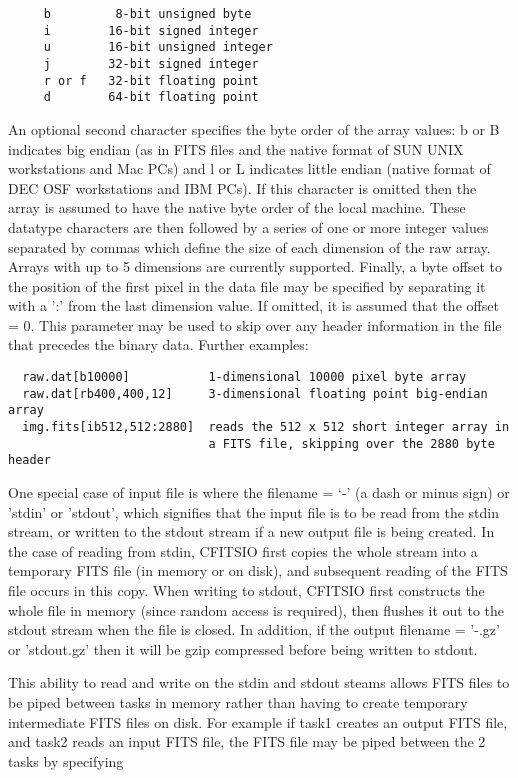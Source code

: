 \documentclass[11pt]{book}
\begin{document}
\begin{verbatim}
     b         8-bit unsigned byte
     i        16-bit signed integer
     u        16-bit unsigned integer
     j        32-bit signed integer
     r or f   32-bit floating point
     d        64-bit floating point
\end{verbatim}
An optional second character specifies the byte order of the array
values: b or B indicates big endian (as in FITS files and the native
format of SUN UNIX workstations and Mac PCs) and l or L indicates
little endian (native format of DEC OSF workstations and IBM PCs).  If
this character is omitted then the array is assumed to have the native
byte order of the local machine.  These datatype characters are then
followed by a series of one or more integer values separated by commas
which define the size of each dimension of the raw array.  Arrays with
up to 5 dimensions are currently supported.  Finally, a byte offset to
the position of the first pixel in the data file may be specified by
separating it with a ':' from the last dimension value.  If omitted, it
is assumed that the offset = 0.  This parameter may be used to skip
over any header information in the file that precedes the binary data.
Further examples:

\begin{verbatim}
  raw.dat[b10000]           1-dimensional 10000 pixel byte array
  raw.dat[rb400,400,12]     3-dimensional floating point big-endian array
  img.fits[ib512,512:2880]  reads the 512 x 512 short integer array in
                            a FITS file, skipping over the 2880 byte header
\end{verbatim}

One special case of input file is where the filename = `-' (a dash or
minus sign) or 'stdin' or 'stdout', which signifies that the input file
is to be read from the stdin stream, or written to the stdout stream if
a new output file is being created.  In the case of reading from stdin,
CFITSIO first copies the whole stream into a temporary FITS file (in
memory or on disk), and subsequent reading of the FITS file occurs in
this copy.  When writing to stdout, CFITSIO first constructs the whole
file in memory (since random access is required), then flushes it out
to the stdout stream when the file is closed.   In addition, if the
output filename = '-.gz' or 'stdout.gz' then it will be gzip compressed
before being written to stdout.

This ability to read and write on the stdin and stdout steams allows
FITS files to be piped between tasks in memory rather than having to
create temporary intermediate FITS files on disk.  For example if task1
creates an output FITS file, and task2 reads an input FITS file, the
FITS file may be piped between the 2 tasks by specifying
\end{document}
